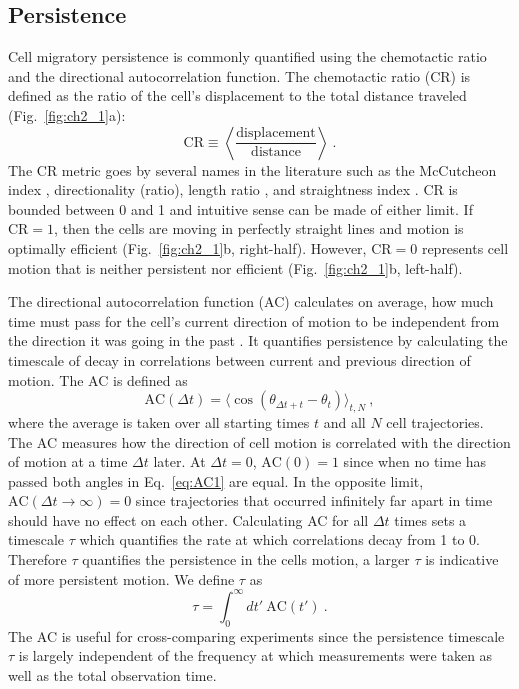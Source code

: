 \subsection{Persistence}

Cell migratory persistence is commonly quantified using the chemotactic ratio and the directional autocorrelation function. The chemotactic ratio (CR) is defined as the ratio of the cell's displacement to the total distance traveled (Fig.\ \ref{fig:ch2_1}a):
\begin{equation} \label{eq:defCR}
    \text{CR} \equiv  \left\langle \frac{\text{displacement}}{\text{distance}} \right\rangle \ .
\end{equation}
The CR metric goes by several names in the literature such as the McCutcheon index \cite{mccutcheon1946chemotaxis}, directionality (ratio), length ratio \cite{gorelik2014quantitative}, and straightness index \cite{codling2008random}.
CR is bounded between 0 and 1 and intuitive sense can be made of either limit. If $\text{CR} = 1$, then the cells are moving in perfectly straight lines and motion is optimally efficient (Fig.\ \ref{fig:ch2_1}b, right-half). However, $\text{CR} = 0$ represents cell motion that is neither persistent nor efficient (Fig.\ \ref{fig:ch2_1}b, left-half).

The directional autocorrelation function (AC) calculates on average, how much time must pass for the cell's current direction of motion to be independent from the direction it was going in the past \cite{gorelik2014quantitative,dang2013inhibitory}.
It quantifies persistence by calculating the timescale of decay in correlations between current and previous direction of motion.
The AC is defined as
\begin{equation} \label{eq:AC1}
    \text{AC}(\Delta t) = \langle \cos(\theta_{\Delta t + t}-\theta_{t}) \rangle_{t,N} \ ,
\end{equation}
where the average is taken over all starting times $t$ and all $N$ cell trajectories. The AC measures how the direction of cell motion is correlated with the direction of motion at a time $\Delta t$ later.
At $\Delta t = 0$, $\text{AC}(0) = 1$ since when no time has passed both angles in Eq.\ \ref{eq:AC1} are equal. In the opposite limit,
$\text{AC}(\Delta t \to \infty) = 0$ since trajectories that occurred infinitely far apart in time should have no effect on each other. Calculating AC for all $\Delta t$ times sets a timescale $\tau$ which quantifies the rate at which correlations decay from 1 to 0. Therefore $\tau$ quantifies the persistence in the cells motion, a larger $\tau$ is indicative of more persistent motion. We define $\tau$ as
\begin{equation} \label{eq:tau1}
    \tau = \int_0^\infty dt' \ \text{AC}(t') \ .
\end{equation}
The AC is useful for cross-comparing experiments since the persistence timescale $\tau$ is largely independent of the frequency at which measurements were taken as well as the total observation time.

